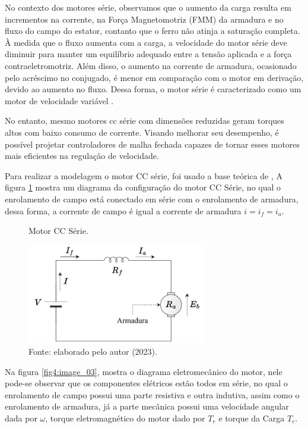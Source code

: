 No contexto dos motores série, observamos que o aumento da carga resulta em incrementos na corrente, na Força Magnetomotriz (FMM) da armadura e no fluxo do campo do estator, contanto que o ferro não atinja a saturação completa. À medida que o fluxo aumenta com a carga, a velocidade do motor série deve diminuir para manter um equilíbrio adequado entre a tensão aplicada e a força contraeletromotriz. Além disso, o aumento na corrente de armadura, ocasionado pelo acréscimo no conjugado, é menor em comparação com o motor em derivação, devido ao aumento no fluxo. Dessa forma, o motor série é caracterizado como um motor de velocidade variável .


No entanto, mesmo motores cc série com dimensões reduzidas geram torques altos com baixo consumo de corrente. Visando melhorar seu desempenho, é possível projetar controladores de malha fechada capazes de tornar esses motores mais eficientes na regulação de velocidade.

Para realizar a modelagem o motor CC série, foi usado a base teórica de \cite{jesus}, A figura \ref{fig4:image_02} mostra um diagrama da configuração do motor CC Série, no qual o enrolamento de campo está conectado em série com o enrolamento de armadura, dessa forma, a  corrente de campo é igual a corrente de armadura $ i = i_f = i_a$.


\begin{figure}[!h]
	\centering
	\caption{Motor CC Série.}
	\includegraphics[width=0.7\textwidth]{Capitulos/2_aeropendulo/4_figuras/esquema_motor_cc.pdf}
	\caption*{Fonte:  elaborado pelo autor (2023).}
	\label{fig4:image_02}
\end{figure}

Na figura \ref{fig4:image_03}, mostra o diagrama eletromecânico do motor, nele pode-se observar que os componentes elétricos estão todos em série, no qual o enrolamento de campo possui uma parte resistiva e outra indutiva, assim como o enrolamento de armadura, já a parte mecânica possui uma velocidade angular dada por $\omega$, torque eletromagnético do motor dado por $T_e$ e torque da Carga $T_c$.


